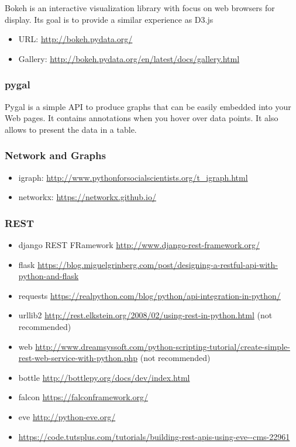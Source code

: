 Bokeh is an interactive visualization library with focus on web browsers
for display. Its goal is to provide a similar experience as D3.js

\begin{itemize}
\item
  URL: \url{http://bokeh.pydata.org/}
\item
  Gallery: \url{http://bokeh.pydata.org/en/latest/docs/gallery.html}
\end{itemize}

\subsubsection{pygal}\label{pygal}

Pygal is a simple API to produce graphs that can be easily embedded into
your Web pages. It contains annotations when you hover over data points.
It also allows to present the data in a table.



\subsubsection{Network and Graphs}\label{network-and-graphs}

\begin{itemize}
\tightlist
\item
  igraph: \url{http://www.pythonforsocialscientists.org/t_igraph.html}
\item
  networkx: \url{https://networkx.github.io/}
\end{itemize}

\subsubsection{REST}\label{rest}

\begin{itemize}
\tightlist
\item
  django REST FRamework \url{http://www.django-rest-framework.org/}
\item
  flask
  \url{https://blog.miguelgrinberg.com/post/designing-a-restful-api-with-python-and-flask}
\item
  requests
  \url{https://realpython.com/blog/python/api-integration-in-python/}
\item
  urllib2
  \url{http://rest.elkstein.org/2008/02/using-rest-in-python.html} (not
  recommended)
\item
  web
  \url{http://www.dreamsyssoft.com/python-scripting-tutorial/create-simple-rest-web-service-with-python.php}
  (not recommended)
\item
  bottle \url{http://bottlepy.org/docs/dev/index.html}
\item
  falcon \url{https://falconframework.org/}
\item
  eve \url{http://python-eve.org/}
\item
  \url{https://code.tutsplus.com/tutorials/building-rest-apis-using-eve--cms-22961}
\end{itemize}


